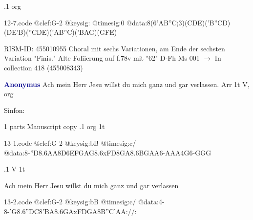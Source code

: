 \documentclass[twocolumn]{book}
\begin{document}
.1  org  
\begin{filecontents*}{12-7.code}
@clef:G-2
@keysig:
@timesig:0
@data:8(6{'AB''C};3)({CDE})({'B''CD})({DE'B})({''CDE})({'AB''C})({'BAG})({GFE})
\end{filecontents*}
\newline
%

\newline RISM-ID: 455010955
\newline Choral mit sechs Variationen, am Ende der sechsten Variation "Finis."
\newline Alte Foliierung auf f.78v mit "62"
\newline D-Fh  Ms 001
\newline $\rightarrow$ In collection 418 (455008343)

\newline \par \vspace{7pt} \textcolor{darkblue}{\textbf{Anonymus  }}
\newline Ach mein Herr Jesu willst du mich ganz und gar verlassen. Arr  1t  
\newline V, org
\newline \begin{itshape}[f.51v, at left:] Sinfon:\end{itshape} 
\newline \textcolor{darkblue}{}  1 parts  
\newline Manuscript copy
.1  org  1t  
\begin{filecontents*}{13-1.code}
@clef:G-2
@keysig:bB
@timesig:c/
@data:8-''D{8.6AA8D6EF}{GAG8.6xFD}{8GA8.6BG}{AA}6-A{AA}4G6-{GGG}
\end{filecontents*}
\newline
%

.1  V  1t
\newline \begin{footnotesize} Ach mein Herr Jesu willst du mich ganz und gar verlassen \end{footnotesize}  
\begin{filecontents*}{13-2.code}
@clef:G-2
@keysig:bB
@timesig:c/
@data:4-8-'G{8.6''DC8'BA}{8.6GAxFD}{GA8B''C}{'AA}://:
\end{filecontents*}
\newline
%
\end{document}
